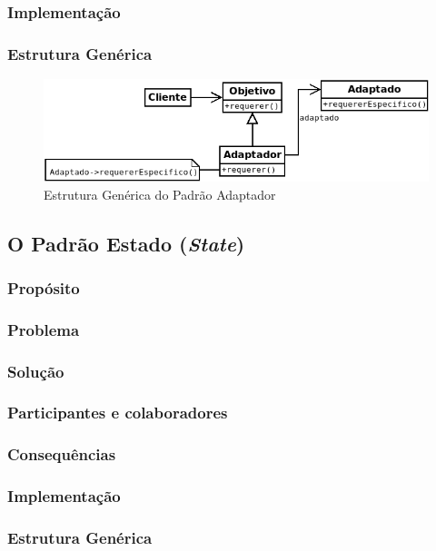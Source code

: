 \subsubsection{Implementação}
\subsubsection{Estrutura Genérica}

\begin{figure}[h]
\begin{center}
\includegraphics[scale=0.6]{adaptador.png}
\caption{Estrutura Genérica do Padrão Adaptador}\label{fig:adaptador}
\end{center}
\end{figure}

\subsection{O Padrão Estado (\textit{State})}
\subsubsection{Propósito}
\subsubsection{Problema}
\subsubsection{Solução}
\subsubsection{Participantes e colaboradores}
\subsubsection{Consequências}
\subsubsection{Implementação}
\subsubsection{Estrutura Genérica}


